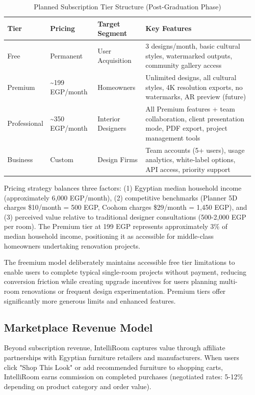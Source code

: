 \begin{table}[htbp]
\centering
\caption{Planned Subscription Tier Structure (Post-Graduation Phase)}
\label{tab:subscription_tiers}
\begin{tabular}{p{2.5cm}p{2.5cm}p{2.5cm}p{5cm}}
\toprule
\textbf{Tier} & \textbf{Pricing} & \textbf{Target Segment} & \textbf{Key Features} \\
\midrule
Free & Permanent & User Acquisition & 3 designs/month, basic cultural styles, watermarked outputs, community gallery access \\
Premium & \textasciitilde199 EGP/month & Homeowners & Unlimited designs, all cultural styles, 4K resolution exports, no watermarks, AR preview (future) \\
Professional & \textasciitilde350 EGP/month & Interior Designers & All Premium features + team collaboration, client presentation mode, PDF export, project management tools \\
Business & Custom & Design Firms & Team accounts (5+ users), usage analytics, white-label options, API access, priority support \\
\bottomrule
\end{tabular}
\end{table}

Pricing strategy balances three factors: (1) Egyptian median household income (approximately 6,000 EGP/month), (2) competitive benchmarks (Planner 5D charges \$10/month = 500 EGP, Coohom charges \$29/month = 1,450 EGP), and (3) perceived value relative to traditional designer consultations (500-2,000 EGP per room). The Premium tier at 199 EGP represents approximately 3\% of median household income, positioning it as accessible for middle-class homeowners undertaking renovation projects.

The freemium model deliberately maintains accessible free tier limitations to enable users to complete typical single-room projects without payment, reducing conversion friction while creating upgrade incentives for users planning multi-room renovations or frequent design experimentation. Premium tiers offer significantly more generous limits and enhanced features.

\subsection{Marketplace Revenue Model}

Beyond subscription revenue, IntelliRoom captures value through affiliate partnerships with Egyptian furniture retailers and manufacturers. When users click "Shop This Look" or add recommended furniture to shopping carts, IntelliRoom earns commission on completed purchases (negotiated rates: 5-12\% depending on product category and order value).

